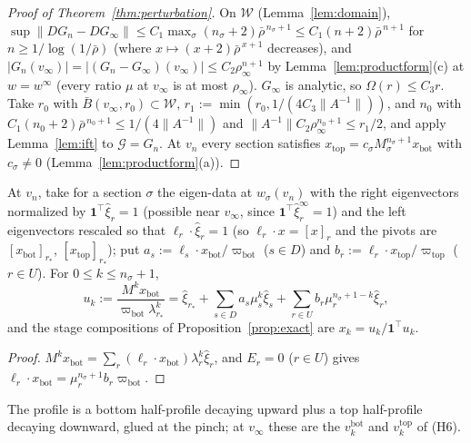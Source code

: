 \documentclass[11pt,a4paper]{report}
\newcommand{\cW}{\mathcal W}
\newcommand{\one}{\mathbf 1}
\newcommand{\xb}{x_{\mathrm{bot}}}
\newcommand{\xt}{x_{\mathrm{top}}}
\newcommand{\piv}{\varpi}
\begin{document}
\begin{proof}[Proof of Theorem~\ref{thm:perturbation}]
On \(\cW\) (Lemma~\ref{lem:domain}), \(\sup\|DG_n-DG_\infty\|\le C_1\max_\sigma(n_\sigma+2)\bar\rho^{\,n_\sigma+1}\le C_1(n+2)\bar\rho^{\,n+1}\) for
\(n\ge1/\log(1/\bar\rho)\) (where \(x\mapsto(x+2)\bar\rho^{\,x+1}\) decreases), and \(|G_n(v_\infty)|=|(G_n-G_\infty)(v_\infty)|\le C_2\rho_\infty^{n+1}\) by
Lemma~\ref{lem:productform}(c) at \(w=w^\infty\) (every ratio \(\mu\) at \(v_\infty\) is at most \(\rho_\infty\)). \(G_\infty\) is analytic, so
\(\Omega(r)\le C_3r\). Take \(r_0\) with \(\bar B(v_\infty,r_0)\subset\cW\), \(r_1:=\min(r_0,1/(4C_3\|A^{-1}\|))\), and \(n_0\) with
\(C_1(n_0+2)\bar\rho^{\,n_0+1}\le1/(4\|A^{-1}\|)\) and \(\|A^{-1}\|C_2\rho_\infty^{n_0+1}\le r_1/2\), and apply Lemma~\ref{lem:ift} to
\(\mathcal G=G_n\). At \(v_n\) every section satisfies \(\xt=c_\sigma M_\sigma^{n_\sigma+1}\xb\) with \(c_\sigma\ne0\) (Lemma~\ref{lem:productform}(a)).
\end{proof}

\begin{lemma}\label{lem:profile}
At \(v_n\), take for a section \(\sigma\) the eigen-data at \(w_\sigma(v_n)\) with the right eigenvectors normalized by \(\one^\top\hat\xi_r=1\)
(possible near \(v_\infty\), since \(\one^\top\hat\xi^\infty_r=1\)) and the left eigenvectors rescaled so that \(\ell_r\cdot\hat\xi_r=1\) (so
\(\ell_r\cdot x=[x]_r\) and the pivots are \([\xb]_{r_*}\), \([\xt]_{r_*}\)); put \(a_s:=\ell_s\cdot\xb/\piv_{\mathrm{bot}}\) (\(s\in D\)) and
\(b_r:=\ell_r\cdot\xt/\piv_{\mathrm{top}}\) (\(r\in U\)). For \(0\le k\le n_\sigma+1\),
\begin{equation}\label{eq:profile}
u_k:=\frac{M^k\xb}{\piv_{\mathrm{bot}}\lambda_{r_*}^k}=\hat\xi_{r_*}+\sum_{s\in D}a_s\mu_s^k\hat\xi_s+\sum_{r\in U}b_r\mu_r^{n_\sigma+1-k}\hat\xi_r ,
\end{equation}
and the stage compositions of Proposition~\ref{prop:exact} are \(x_k=u_k/\one^\top u_k\).
\end{lemma}
\begin{proof}
\(M^k\xb=\sum_r(\ell_r\cdot\xb)\lambda_r^k\hat\xi_r\), and \(E_r=0\) (\(r\in U\)) gives \(\ell_r\cdot\xb=\mu_r^{n_\sigma+1}b_r\piv_{\mathrm{bot}}\).
\end{proof}

The profile is a bottom half-profile decaying upward plus a top half-profile decaying downward, glued at the pinch; at
\(v_\infty\) these are the \(v^{\mathrm{bot}}_k\) and \(v^{\mathrm{top}}_k\) of (H6).
\end{document}

